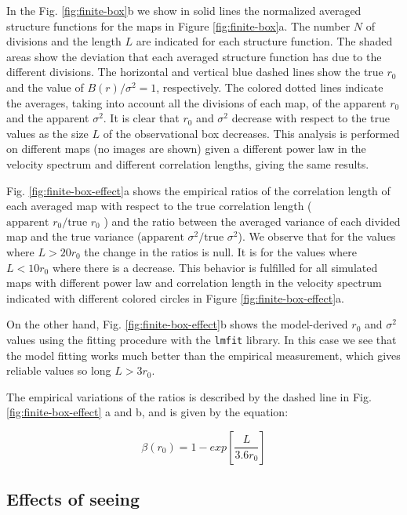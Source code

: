 \documentclass[fleqn,usenatbib, useAMS, a4paper]{mnras}
\begin{document}
In the Fig. \ref{fig:finite-box}b we show in solid lines the normalized averaged structure functions for the maps in Figure \ref{fig:finite-box}a.
The number \(N\) of divisions and the length \(L\) are indicated for each structure function.
The shaded areas show the deviation that each averaged structure function has due to the different divisions. 
The horizontal and vertical blue dashed lines show the true \(r_{0}\) and the value of \(B(r) / \sigma^2 = 1 \), respectively.
The colored dotted lines indicate the averages, taking into account all the divisions of each map, of the apparent \(r_ {0}\) and the apparent \(\sigma^2 \).
It is clear that \(r_0\) and \(\sigma^ 2 \) decrease with respect to the true values as the size \(L\) of the observational box decreases. 
This analysis is performed on different maps (no images are shown) given a different power law in the velocity spectrum and different correlation lengths, giving the same results. 

Fig. \ref{fig:finite-box-effect}a shows the empirical ratios of the correlation length of each averaged map with respect to the true correlation length (\(\text{apparent } r_ 0 /\text{true } r_0 \) ) and the ratio between the averaged variance of each divided map and the true variance (\(\text{apparent } \sigma^2  / \text{true } \sigma^2\)).
We observe that for the values where \(L> 20r_0 \) the change in the ratios is null.
It is for the values where \( L < 10 r_0 \) where there is a decrease.
This behavior is fulfilled for all simulated maps with different power law and correlation length in the velocity spectrum indicated with different colored circles in Figure \ref{fig:finite-box-effect}a.

On the other hand, Fig. \ref{fig:finite-box-effect}b shows the model-derived \(r_0\) and \(\sigma^ 2 \) values using the fitting procedure with the \texttt{lmfit} library.
In this case we see that the model fitting works much better than the empirical measurement, which gives reliable values so long \(L > 3r_0 \).

The empirical variations of the ratios is described by the  dashed line in Fig. \ref{fig:finite-box-effect} a and b, and is given by the equation: 

\begin{equation}\label{eq:ajustebox}
\beta(r_0) = 1 - exp \left[ \frac{L}{3.6r_0} \right] 
\end{equation}

\subsection{Effects of seeing}
\label{sec:effects-seeing-struc}
\end{document}
